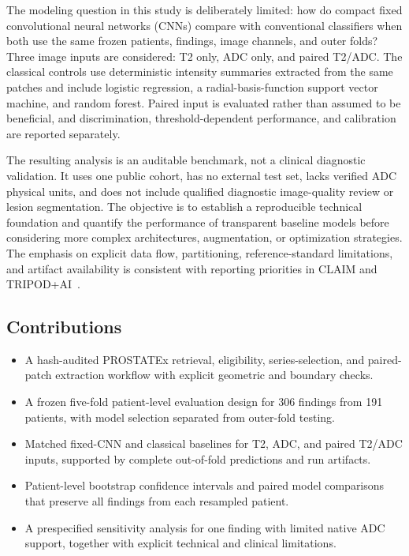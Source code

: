 \documentclass[11pt]{article}
\begin{document}
The modeling question in this study is deliberately limited: how do compact fixed convolutional neural networks (CNNs) compare with conventional classifiers when both use the same frozen patients, findings, image channels, and outer folds? Three image inputs are considered: T2 only, ADC only, and paired T2/ADC. The classical controls use deterministic intensity summaries extracted from the same patches and include logistic regression, a radial-basis-function support vector machine, and random forest. Paired input is evaluated rather than assumed to be beneficial, and discrimination, threshold-dependent performance, and calibration are reported separately.

The resulting analysis is an auditable benchmark, not a clinical diagnostic validation. It uses one public cohort, has no external test set, lacks verified ADC physical units, and does not include qualified diagnostic image-quality review or lesion segmentation. The objective is to establish a reproducible technical foundation and quantify the performance of transparent baseline models before considering more complex architectures, augmentation, or optimization strategies. The emphasis on explicit data flow, partitioning, reference-standard limitations, and artifact availability is consistent with reporting priorities in CLAIM and TRIPOD+AI~\cite{claim,tripod-ai}.

\subsection{Contributions}\label{sec:1.1}

\begin{itemize}
\item A hash-audited PROSTATEx retrieval, eligibility, series-selection, and paired-patch extraction workflow with explicit geometric and boundary checks.
\item A frozen five-fold patient-level evaluation design for 306 findings from 191 patients, with model selection separated from outer-fold testing.
\item Matched fixed-CNN and classical baselines for T2, ADC, and paired T2/ADC inputs, supported by complete out-of-fold predictions and run artifacts.
\item Patient-level bootstrap confidence intervals and paired model comparisons that preserve all findings from each resampled patient.
\item A prespecified sensitivity analysis for one finding with limited native ADC support, together with explicit technical and clinical limitations.
\end{itemize}
\end{document}
